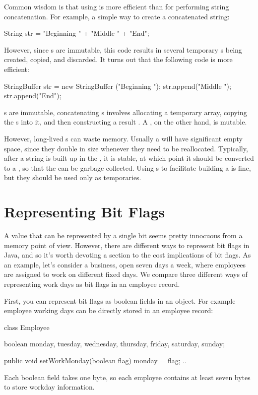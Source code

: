 Common wisdom is that using  is more efficient than
 for performing string concatenation. For example, a simple way
to create a concatenated string:
\begin{shortlisting}
	String str = "Beginning  " + "Middle " +  "End";
\end{shortlisting}
However, since s are immutable, this code results in several
temporary s being created, copied, and discarded.  It turns out
that the following code is more efficient:
\begin{shortlisting}
	StringBuffer str = new StringBuffer ("Beginning ");
	str.append("Middle ");
    str.append("End");
\end{shortlisting}
s are immutable, concatenating s involves allocating a temporary
 array, copying the s into it, and then constructing
a result . A , on the other hand, is mutable.

However, long-lived s can waste memory. Usually a
 will have significant empty space, since they double in
size whenever they need to be reallocated. Typically, after a string is built up in the
, it is stable, at which point it should be converted 
to a , so that the  can be
garbage collected. Using s to facilitate
building a  is fine, but they should be used only as temporaries.

\section{Representing Bit Flags}
\label{sec:bit-flags}

A value that can be represented by a single bit seems pretty innocuous from a
memory point of view. However, there are different ways to represent bit flags
in Java, and so it's worth devoting a section to the cost implications of
bit flags. As an example, let's consider a business, open seven days a
week, where employees are assigned to work on different fixed days.  We compare three
different ways of representing work days as bit flags in an employee record.
 
First, you can represent bit flags as boolean fields in an object. For example
employee working days can be directly stored in an employee record:
\begin{shortlisting}

    class Employee {
    	boolean monday, tuesday, wednesday, thursday, friday, saturday, sunday;
    	
    	public void setWorkMonday(boolean flag) {
    		monday = flag;
    	}
    	..
    }
    
\end{shortlisting}
Each boolean field takes one byte, so each employee contains at least seven
bytes to store workday information. 

